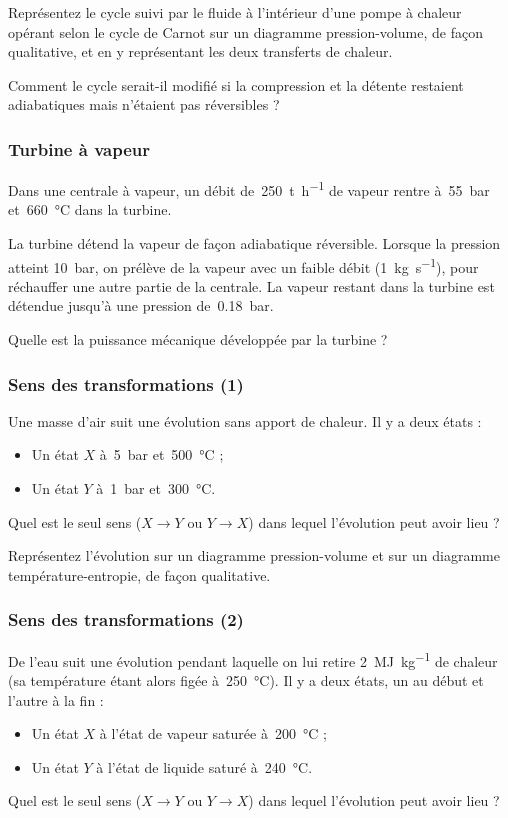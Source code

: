 	Représentez le cycle suivi par le fluide à l’intérieur d’une pompe à chaleur opérant selon le cycle de Carnot sur un diagramme pression-volume, de façon qualitative, et en y représentant les deux transferts de chaleur.
	
	Comment le cycle serait-il modifié si la compression et la détente restaient adiabatiques mais n’étaient pas réversibles ?

\subsubsection{Turbine à vapeur}

	Dans une centrale à vapeur, un débit de~\SI{250}{\tonne\per\hour} de vapeur rentre à~\SI{55}{\bar} et~\SI{660}{\degreeCelsius} dans la turbine.
	
	La turbine détend la vapeur de façon adiabatique réversible. Lorsque la pression atteint \SI{10}{\bar}, on prélève de la vapeur avec un faible débit (\SI{1}{\kilogram\per\second}), pour réchauffer une autre partie de la centrale. La vapeur restant dans la turbine est détendue jusqu’à une pression de~\SI{0,18}{\bar}.
	
	Quelle est la puissance mécanique développée par la turbine ?

\subsubsection{Sens des transformations (1)}

	Une masse d’air suit une évolution sans apport de chaleur. Il y a deux états :
		\begin{itemize}
			\item Un état $X$ à~\SI{5}{\bar} et~\SI{500}{\degreeCelsius} ;
			\item Un état $Y$ à~\SI{1}{\bar} et~\SI{300}{\degreeCelsius}.
		\end{itemize}
		
	Quel est le seul sens ($X \to Y$ ou $Y \to X$) dans lequel l’évolution peut avoir lieu ?
	
	Représentez l’évolution sur un diagramme pression-volume et sur un diagramme température-entropie, de façon qualitative.

\subsubsection{Sens des transformations (2)}

	De l’eau suit une évolution pendant laquelle on lui retire \SI{2}{\mega\joule\per\kilogram} de chaleur (sa température étant alors figée à~\SI{250}{\degreeCelsius}). Il y a deux états, un au début et l’autre à la fin :
		\begin{itemize}
			\item Un état $X$ à l’état de vapeur saturée à~\SI{200}{\degreeCelsius} ;
			\item Un état $Y$ à l’état de liquide saturé à~\SI{240}{\degreeCelsius}.
		\end{itemize}
	Quel est le seul sens ($X \to Y$ ou $Y \to X$) dans lequel l’évolution peut avoir lieu ?

